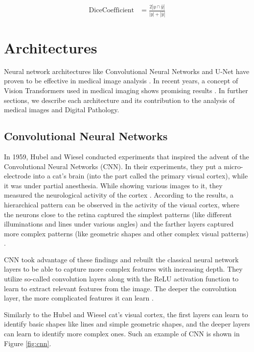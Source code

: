 \begin{align}
\label{eq:dice}
\text{DiceCoefficient} &= \frac{2|y \cap \hat{y}|}{|y| + |\hat{y}|}
\end{align}

\section{Architectures}
\label{chapter:dnn-section:arch}
Neural network architectures like Convolutional Neural Networks \cite{LeCun2015-2} and U-Net \cite{Ronneberger2015} have proven to be effective in medical image analysis \cite{Santosh2022-2}. In recent years, a concept of Vision Transformers \cite{Dosovitskiy2020, Hu2023} used in medical imaging shows promising results \cite{Shamshad2023, Hu2023, He2023}. In further sections, we describe each architecture and its contribution to the analysis of medical images and Digital Pathology.

\subsection{Convolutional Neural Networks}
In 1959, Hubel and Wiesel conducted experiments that inspired the advent of the Convolutional Neural Networks (CNN). In their experiments, they put a micro-electrode into a cat's brain (into the part called the primary visual cortex), while it was under partial anesthesia. While showing various images to it, they measured the neurological activity of the cortex \cite{Hubel1959}. According to the results, a hierarchical pattern can be observed in the activity of the visual cortex, where the neurons close to the retina captured the simplest patterns (like different illuminations and lines under various angles) and the farther layers captured more complex patterns (like geometric shapes and other complex visual patterns) \cite{Hubel1959}. 

CNN took advantage of these findings and rebuilt the classical neural network layers to be able to capture more complex features with increasing depth. They utilize so-called convolution layers along with the ReLU activation function to learn to extract relevant features from the image. The deeper the convolution layer, the more complicated features it can learn \cite{Santosh2022-2}. 

Similarly to the Hubel and Wiesel cat's visual cortex, the first layers can learn to identify basic shapes like lines and simple geometric shapes, and the deeper layers can learn to identify more complex ones. Such an example of CNN is shown in Figure \ref{fig:cnn}.

